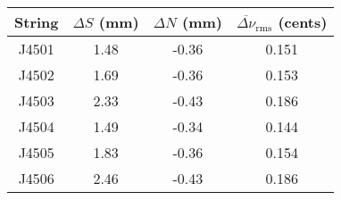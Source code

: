 \begin{tabular}{cccc}
\toprule
String & $\Delta S$ (mm) & $\Delta N$ (mm) & $\overline{\Delta \nu}_\text{rms}$ (cents) \\
\midrule
J4501 & 1.48 & -0.36 & 0.151 \\
J4502 & 1.69 & -0.36 & 0.153 \\
J4503 & 2.33 & -0.43 & 0.186 \\
J4504 & 1.49 & -0.34 & 0.144 \\
J4505 & 1.83 & -0.36 & 0.154 \\
J4506 & 2.46 & -0.43 & 0.186 \\
\bottomrule
\end{tabular}
